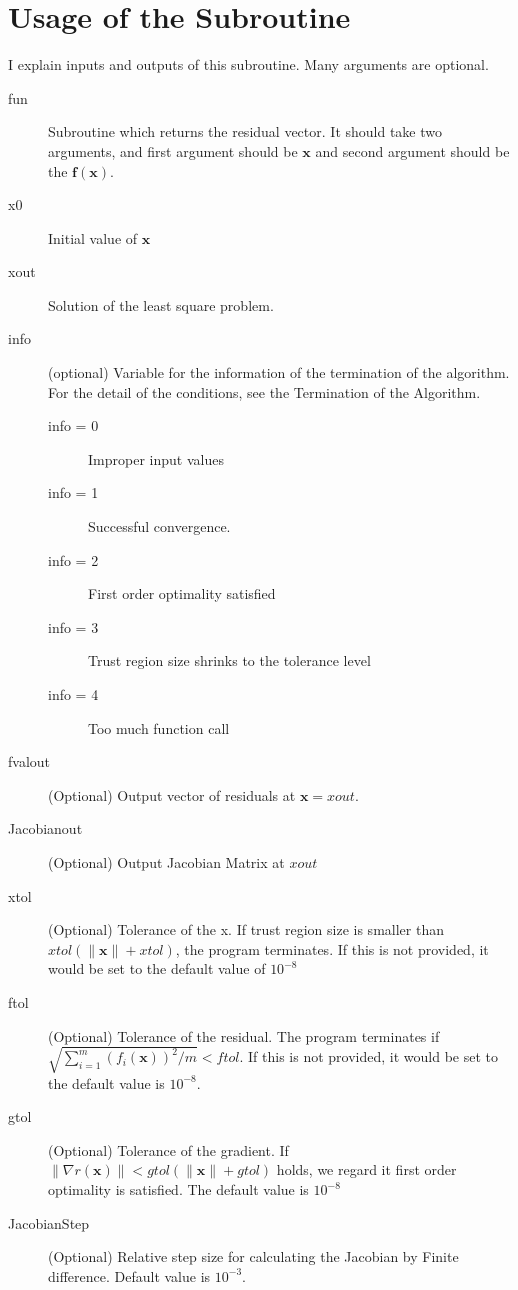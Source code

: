 \documentclass[12pt]{article}
\def\xb{{\mathbf{x}}}
\def\fb{{\mathbf{f}}}
\begin{document}
\section{Usage of the Subroutine}
I explain inputs and outputs of this subroutine. Many arguments are optional. 
\begin{description}
	\item[fun] Subroutine which returns the residual vector. It should take two arguments, and
      first argument should be $\xb$ and second argument should be the $\fb(\xb)$.
	\item[x0] Initial value of $\xb$
	\item[xout] Solution of the least square problem.
	\item[info] (optional) Variable for the information of the termination of the algorithm. For
      the detail of the conditions, see the Termination of the Algorithm. 
	\begin{description}
		\item[info = 0] Improper input values
		\item[info = 1] Successful convergence. 
		\item[info = 2] First order optimality satisfied
		\item[info = 3] Trust region size shrinks to the tolerance level
		\item[info = 4] Too much function call
	\end{description}
	\item[fvalout] (Optional) Output vector of residuals at $\xb = xout$.
	\item[Jacobianout]  (Optional) Output Jacobian Matrix at $xout$
	\item[xtol] (Optional) Tolerance of the x. If trust region size is smaller than
      $xtol(\|\xb\|+xtol)$, the program terminates. If this is not provided, it would be set to
      the default value of $10^{-8}$
	\item[ftol] (Optional) Tolerance of the residual. The program terminates if
      $\sqrt{\sum_{i=1}^m(f_i(\xb))^2/m} < ftol $. If this is not provided, it would be set to
      the default value is $10^{-8}$.
	\item[gtol] (Optional)  Tolerance of the gradient. If  $ \|\nabla r(\xb)\| <
      gtol(\|\xb\|+gtol)$ holds, we regard it first order optimality is satisfied. The default
      value is $10^{-8}$
	\item[JacobianStep] (Optional) Relative step size for calculating the Jacobian by Finite
      difference. Default value is $10^{-3}$. 

\end{description}
\end{document}
